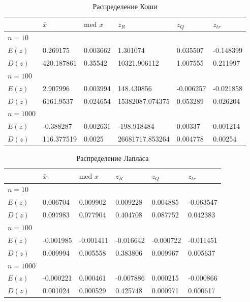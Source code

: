 \documentclass[12pt,a4paper]{article}
\begin{document}
\begin{table}[h!]
	\centering
	\begin{tabular}{|l|l|l|l|l|l|}
		\hline&$\bar x$ &$\text{med }x$  &$z_R$  &$z_Q$  &$z_{tr}$  \\ \hline
		$n=10$&&&&& \\ \hline$E(z)$&0.269175&0.003662&1.301074&0.035507&-0.148399 \\ \hline$D(z)$&420.187861&0.35542&10321.906112&1.007555&0.211997 \\ \hline
		
		$n=100$&&&&& \\ \hline$E(z)$&2.907996&0.003994&148.430856&-0.006257&-0.021858 \\ \hline$D(z)$&6161.9537&0.024654&15382087.074375&0.053289&0.026204 \\ \hline
		
		$n=1000$&&&&& \\ \hline$E(z)$&-0.388287&0.002631&-198.918484&0.00337&0.001214 \\ \hline$D(z)$&116.377519&0.0025&26681717.853264&0.004778&0.00254 \\ \hline
	\end{tabular}
	\label{tab:cauchy}
	\caption{Распределение Коши}
\end{table}

\begin{table}[h!]
	\centering
	\begin{tabular}{|l|l|l|l|l|l|}
		\hline&$\bar x$ &$\text{med }x$  &$z_R$  &$z_Q$  &$z_{tr}$  \\ \hline
		$n=10$&&&&& \\ \hline$E(z)$&0.006704&0.009902&0.009228&0.004885&-0.063547 \\ \hline$D(z)$&0.097983&0.077904&0.404708&0.087752&0.042383 \\ \hline
		
		$n=100$&&&&& \\ \hline$E(z)$&-0.001985&-0.001411&-0.016642&-0.000722&-0.011451 \\ \hline$D(z)$&0.009994&0.005558&0.383806&0.009967&0.005637 \\ \hline
		
		$n=1000$&&&&& \\ \hline$E(z)$&-0.000221&0.000461&-0.007886&0.000215&-0.000866 \\ \hline$D(z)$&0.001024&0.000529&0.425748&0.000971&0.000617 \\ \hline
	\end{tabular}
	\caption{Распределение Лапласа}
\end{table}
\end{document}
